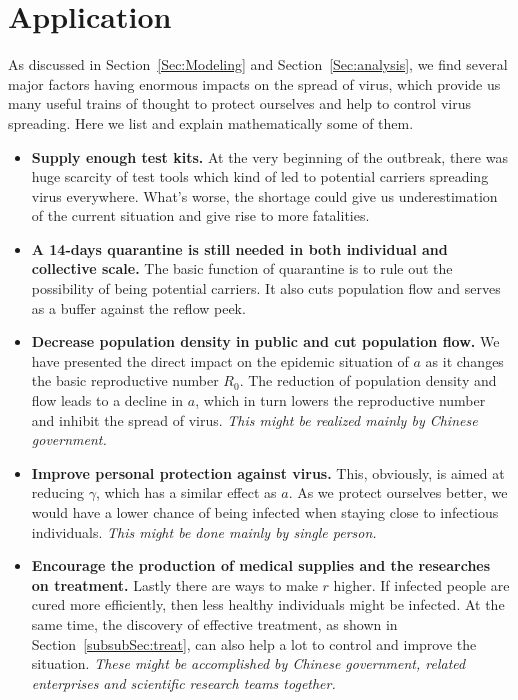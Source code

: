 \documentclass[12pt]{mcmthesis}
\begin{document}
\section{Application}
As discussed in Section~\ref{Sec:Modeling} and Section~\ref{Sec:analysis}, we find several major factors having enormous impacts on the spread of virus, which provide us many useful trains of thought to protect ourselves and help to control virus spreading. Here we list and explain mathematically some of them.

\begin{itemize}
    \item \textbf{Supply enough test kits.} At the very beginning of the outbreak, there was huge scarcity of test tools which kind of led to potential carriers spreading virus everywhere. What's worse, the shortage could give us underestimation of the current situation and give rise to more fatalities.
    \item \textbf{A 14-days quarantine is still needed in both individual and collective scale.} The basic function of quarantine is to rule out the possibility of being potential carriers. It also cuts population flow and serves as a buffer against the reflow peek.
    \item \textbf{Decrease population density in public and cut population flow.} We have presented the direct impact on the epidemic situation of $a$ as it changes the basic reproductive number $R_0$. The reduction of population density and flow leads to a decline in $a$, which in turn lowers the reproductive number and inhibit the spread of virus. \textit{This might be realized mainly by Chinese government.}
    \item \textbf{Improve personal protection against virus.} This, obviously, is aimed at reducing $\gamma$, which has a similar effect as $a$. As we protect ourselves better, we would have a lower chance of being infected when staying close to infectious individuals. \textit{This might be done mainly by single person.}
    \item \textbf{Encourage the production of medical supplies and the researches on treatment.} Lastly there are ways to make $r$ higher. If infected people are cured more efficiently, then less healthy individuals might be infected. At the same time, the discovery of effective treatment, as shown in Section~\ref{subsubSec:treat}, can also help a lot to control and improve the situation. \textit{These might be accomplished by Chinese government, related enterprises and scientific research teams together.}
\end{itemize}
    
\end{document}
